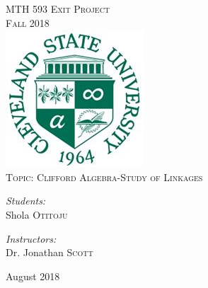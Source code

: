 \documentclass[12pt,onecolumn,letterpaper]{article} %
\begin{document}
\begin{titlepage}
\begin{center}


\textsc{\LARGE MTH 593 Exit Project  }\\[0.5cm]
\textsc{\Large Fall 2018}\\[4cm]
\includegraphics[width=0.35\linewidth]{temp.JPG}\\[2cm]




\textsc{\Large Topic:  Clifford Algebra-Study of Linkages}\\[2cm]

\begin{minipage}{0.4\textwidth}
\begin{flushleft} \large
\emph{Students:}\\

Shola \textsc{Otitoju}\\

\end{flushleft}
\end{minipage}
\begin{minipage}{0.4\textwidth}
\begin{flushright} \large
\emph{Instructors:} \\

Dr. Jonathan \textsc{Scott}
 
  
\end{flushright}
\end{minipage}

\vfill

{\large August 2018}

\end{center}
\end{titlepage}
\tableofcontents
\listoffigures
\end{document}
